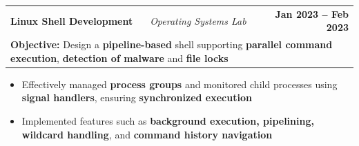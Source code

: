 \documentclass[letterpaper]{article}
\makeatletter
\newcommand{\resumeProjectHeading}[4]{
  \item
    \begin{tabular*}{1.0\textwidth}[t]{l @{\hspace{0.5em}} | @{\hspace{0.5em}} l @{\extracolsep{\fill}} r}
      \textbf{#1} & \textit{\small #2} & \textbf{\small #3} \\
      \multicolumn{3}{l}{\textbf{\small Objective: }\small #4} \\
    \end{tabular*}
    \vspace{-10pt}
}
\newcommand{\resumeItem}[1]{
  \item 
    \small{{#1 \vspace{-2pt}}}
}
\newcommand{\resumeItemListStart}{
  \begin{itemize}[leftmargin=0.2in]
}
\newcommand{\resumeItemListEnd}{
  \end{itemize}
}
\makeatother
\begin{document}
  \resumeProjectHeading
  {Linux Shell Development}
  {Operating Systems Lab}
  {Jan 2023 -- Feb 2023}
  {Design a \textbf{pipeline-based} shell supporting \textbf{parallel command execution}, \textbf{detection of malware} and \textbf{file locks}}
  \resumeItemListStart
    \resumeItem{Effectively managed \textbf{process groups} and monitored child processes using \textbf{signal handlers}, ensuring \textbf{synchronized execution}}
    \resumeItem{Implemented features such as \textbf{background execution, pipelining, wildcard handling}, and \textbf{command history navigation}}
  \resumeItemListEnd



\end{document}
